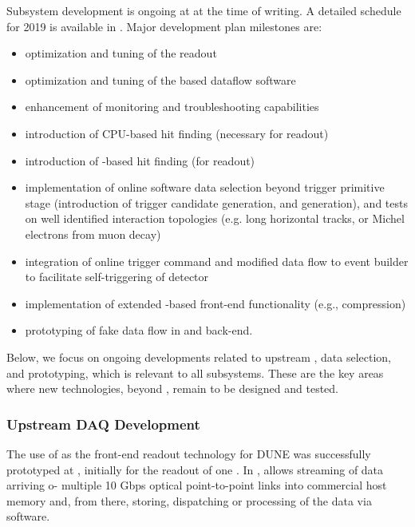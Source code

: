 Subsystem development is ongoing at  at the time of
writing. A detailed schedule for 2019 is available
in \cite{bib:docdb14095}. Major development plan milestones are:
\begin{itemize}
\item optimization and tuning of the  readout
\item optimization and tuning of the  based dataflow software
\item enhancement of monitoring and troubleshooting capabilities
\item introduction of CPU-based hit finding (necessary for  readout)
\item introduction of -based hit finding (for  readout)
\item implementation of online software data selection beyond trigger
primitive stage (introduction of trigger candidate generation, and
 generation), and tests on well identified interaction
topologies (e.g. long horizontal tracks, or Michel electrons from muon decay)
\item integration of online trigger command and modified data flow to event
builder to facilitate self-triggering of detector
\item implementation of extended -based front-end functionality
(e.g., compression)
\item prototyping of fake  data flow in  and back-end.
\end{itemize}

Below, we focus on ongoing developments related to upstream ,
data selection, and  prototyping, which is relevant to all  subsystems. These are the key areas where new technologies, beyond , remain to be designed and tested.


\subsubsection{Upstream DAQ Development}

The use of  as the front-end readout technology for DUNE was
successfully prototyped at , initially for the readout of one
. In ,  allows streaming of data arriving o- multiple 10
Gbps optical point-to-point links into commercial host memory and,
from there, storing, dispatching or processing of the data via
software. 

